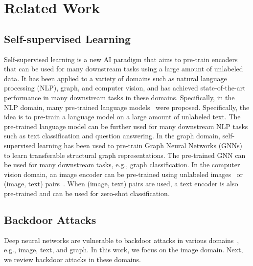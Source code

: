 \section{Related Work}





\subsection{Self-supervised Learning}
Self-supervised learning is a new AI paradigm that aims to pre-train encoders that can be used for many downstream tasks using a large amount of unlabeled data. It has been applied to a variety of domains such as  natural language processing (NLP), graph, and computer vision, and has achieved state-of-the-art performance in many downstream tasks in these domains. 
Specifically, in the   NLP domain, many pre-trained language models~\cite{devlin2018bert,radford2018improving,radford2019language,brown2020language,yang2019xlnet} were proposed. Specifically, the idea is to pre-train a language model on a large amount of unlabeled text. The pre-trained language model can be further used for many downstream NLP tasks such as text classification and question answering. In the graph domain, self-supervised learning has been used to pre-train Graph Neural Networks (GNNs)~\cite{hu2020strategies,qiu2020gcc} to learn  transferable structural graph representations. The pre-trained GNN can be used for many downstream tasks, e.g., graph classification. 
In the computer vision domain, an image encoder can be pre-trained using unlabeled images~\cite{hadsell2006dimensionality,he2020momentum,chen2020simple,hjelm2018learning,grill2020bootstrap} or  (image, text) pairs~\cite{srivastava2012multimodal,joulin2016learning,thomee2016yfcc100m,li2020unicoder,radford2021learning}. When   (image, text) pairs are used, a text encoder is also pre-trained and can be used for zero-shot classification. 







\subsection{Backdoor Attacks}
Deep neural networks are vulnerable to backdoor attacks in various domains~\cite{gu2017badnets,chen2017targeted,liutrojaning2018,dai2019backdoor,bagdasaryan2020backdoor,zhang2020backdoor,xi2020graph}, e.g., image, text, and graph. In this work, we focus on the image domain. Next, we review backdoor attacks in these domains. 


